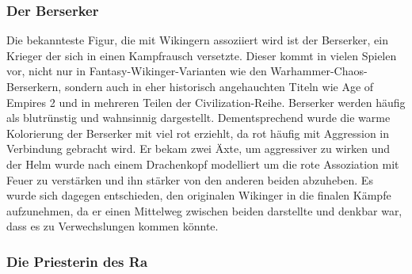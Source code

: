 \documentclass[extern,palatino]{cgBA}
\begin{document}
\subsubsection{Der Berserker}
Die bekannteste Figur, die mit Wikingern assoziiert wird ist der Berserker, ein Krieger der sich in einen Kampfrausch versetzte. Dieser kommt in vielen Spielen vor, nicht nur in Fantasy-Wikinger-Varianten wie den Warhammer-Chaos-Berserkern, sondern auch in eher historisch angehauchten Titeln wie Age of Empires 2 und in mehreren Teilen der Civilization-Reihe. Berserker werden häufig als blutrünstig und wahnsinnig dargestellt. Dementsprechend wurde die warme Kolorierung der Berserker mit viel rot erziehlt, da rot häufig mit Aggression in Verbindung gebracht wird. Er bekam zwei Äxte, um aggressiver zu wirken und der Helm wurde nach einem Drachenkopf modelliert um die rote Assoziation mit Feuer zu verstärken und ihn stärker von den anderen beiden abzuheben. Es wurde sich dagegen entschieden, den originalen Wikinger in die finalen Kämpfe aufzunehmen, da er einen Mittelweg zwischen beiden darstellte und denkbar war, dass es zu Verwechslungen kommen könnte.
\newpage
\subsubsection{Die Priesterin des Ra}
\end{document}
